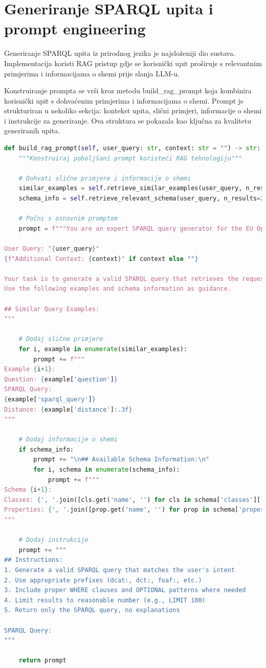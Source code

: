 \section{Generiranje SPARQL upita i prompt engineering}

Generiranje SPARQL upita iz prirodnog jezika je najsloženiji dio sustava. Implementacija koristi RAG pristup gdje se korisnički upit proširuje s relevantnim primjerima i informacijama o shemi prije slanja LLM-u.

Konstruiranje prompta se vrši kroz metodu build\_rag\_prompt koja kombinira korisnički upit s dohvaćenim primjerima i informacijama o shemi. Prompt je strukturiran u nekoliko sekcija: kontekst upita, slični primjeri, informacije o shemi i instrukcije za generiranje. Ova struktura se pokazala kao ključna za kvalitetu generiranih upita.

\begin{lstlisting}[language=Python, caption=Implementacija konstruiranja RAG prompta]
def build_rag_prompt(self, user_query: str, context: str = "") -> str:
    """Konstruiraj poboljšani prompt koristeći RAG tehnologiju"""
    
    # Dohvati slične primjere i informacije o shemi
    similar_examples = self.retrieve_similar_examples(user_query, n_results=3)
    schema_info = self.retrieve_relevant_schema(user_query, n_results=2)
    
    # Počni s osnovnim promptom
    prompt = f"""You are an expert SPARQL query generator for the EU Open Data Portal.
    
User Query: "{user_query}"
{f"Additional Context: {context}" if context else ""}

Your task is to generate a valid SPARQL query that retrieves the requested data.
Use the following examples and schema information as guidance.

## Similar Query Examples:
"""
    
    # Dodaj slične primjere
    for i, example in enumerate(similar_examples):
        prompt += f"""
Example {i+1}:
Question: {example['question']}
SPARQL Query:
{example['sparql_query']}
Distance: {example['distance']:.3f}
"""
    
    # Dodaj informacije o shemi
    if schema_info:
        prompt += "\n## Available Schema Information:\n"
        for i, schema in enumerate(schema_info):
            prompt += f"""
Schema {i+1}:
Classes: {', '.join([cls.get('name', '') for cls in schema['classes'][:10]])}
Properties: {', '.join([prop.get('name', '') for prop in schema['properties'][:15]])}
"""
    
    # Dodaj instrukcije
    prompt += """
## Instructions:
1. Generate a valid SPARQL query that matches the user's intent
2. Use appropriate prefixes (dcat:, dct:, foaf:, etc.)
3. Include proper WHERE clauses and OPTIONAL patterns where needed
4. Limit results to reasonable number (e.g., LIMIT 100)
5. Return only the SPARQL query, no explanations

SPARQL Query:
"""
    
    return prompt
\end{lstlisting}

